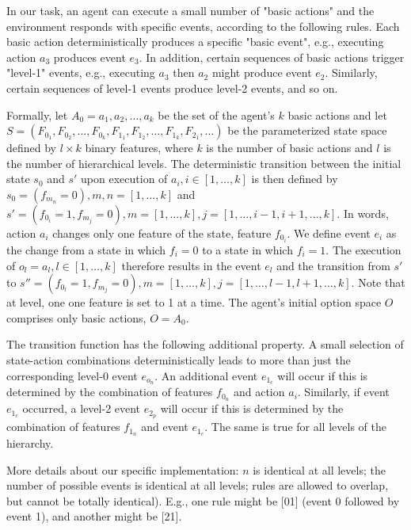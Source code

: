 \documentclass{article}
\begin{document}
In our task, an agent can execute a small number of "basic actions" and the environment responds with specific events, according to the following rules. Each basic action deterministically produces a specific "basic event", e.g., executing action $a_3$ produces event $e_3$. In addition, certain sequences of basic actions trigger "level-1" events, e.g., executing $a_3$ then $a_2$ might produce event $e_2$. Similarly, certain sequences of level-1 events produce level-2 events, and so on.

Formally, let $A_0 = a_1, a_2, \ldots, a_k$ be the set of the agent's $k$ basic actions and let $S = (F_{0_1}, F_{0_2}, \ldots, F_{0_k}, F_{1_1}, F_{1_2}, \ldots, F_{1_k}, F_{2_1}, \ldots)$ be the parameterized state space defined by $l \times k$ binary features, where $k$ is the number of basic actions and $l$ is the number of hierarchical levels. 
The deterministic transition between the initial state $s_0$ and $s'$ upon execution of $a_i, i \in [1, \ldots, k]$ is then defined by $s_0 = (f_{m_n} = 0), m, n = [1, \ldots, k]$ and $s' = (f_{0_i} = 1, f_{m_j} = 0), m = [1, \ldots, k], j = [1, \ldots, i-1, i+1, \ldots, k]$. In words, action $a_i$ changes only one feature of the state, feature $f_{0_i}$. We define event $e_i$ as the change from a state in which $f_i = 0$ to a state in which $f_i = 1$. The execution of $o_l = a_l, l \in [1, \ldots, k]$ therefore results in the event $e_l$ and the transition from $s'$ to $s'' = (f_{0_l} = 1, f_{m_j} = 0), m = [1, \ldots, k], j = [1, \ldots, l-1, l+1, \ldots, k]$. Note that at level, one one feature is set to 1 at a time.  The agent's initial option space $O$ comprises only basic actions, $O = A_0$.

The transition function has the following additional property. A small selection of state-action combinations deterministically leads to more than just the corresponding level-0 event $e_{o_n}$. An additional event $e_{1_c}$ will occur if this is determined by the combination of features $f_{0_n}$ and action $a_i$. Similarly, if event $e_{1_c}$ occurred, a level-2 event $e_{2_p}$ will occur if this is determined by the combination of features $f_{1_n}$ and event $e_{1_c}$. The same is true for all levels of the hierarchy. 

More details about our specific implementation: $n$ is identical at all levels; the number of possible events is identical at all levels; rules are allowed to overlap, but cannot be totally identical). E.g., one rule might be [01] (event 0 followed by event 1), and another might be [21].
\end{document}
